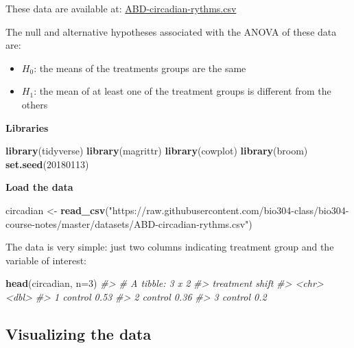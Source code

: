 \documentclass[]{book}
\newenvironment{Shaded}{\begin{snugshade}}{\end{snugshade}}
\newcommand{\CommentTok}[1]{\textcolor[rgb]{0.56,0.35,0.01}{\textit{#1}}}
\newcommand{\DataTypeTok}[1]{\textcolor[rgb]{0.13,0.29,0.53}{#1}}
\newcommand{\DecValTok}[1]{\textcolor[rgb]{0.00,0.00,0.81}{#1}}
\newcommand{\KeywordTok}[1]{\textcolor[rgb]{0.13,0.29,0.53}{\textbf{#1}}}
\newcommand{\NormalTok}[1]{#1}
\newcommand{\StringTok}[1]{\textcolor[rgb]{0.31,0.60,0.02}{#1}}
\providecommand{\tightlist}{%
  \setlength{\itemsep}{0pt}\setlength{\parskip}{0pt}}
\theoremstyle{definition}
\theoremstyle{definition}
\theoremstyle{definition}
\theoremstyle{remark}
\begin{document}
These data are available at:
\href{https://raw.githubusercontent.com/bio304-class/bio304-course-notes/master/datasets/ABD-circadian-rythms.csv}{ABD-circadian-rythms.csv}

The null and alternative hypotheses associated with the ANOVA of these
data are:

\begin{itemize}
\tightlist
\item
  \(H_0\): the means of the treatments groups are the same
\item
  \(H_1\): the mean of at least one of the treatment groups is different
  from the others
\end{itemize}

\textbf{Libraries}

\begin{Shaded}
\begin{Highlighting}[]
\KeywordTok{library}\NormalTok{(tidyverse)}
\KeywordTok{library}\NormalTok{(magrittr)}
\KeywordTok{library}\NormalTok{(cowplot)}
\KeywordTok{library}\NormalTok{(broom)}
\KeywordTok{set.seed}\NormalTok{(}\DecValTok{20180113}\NormalTok{)}
\end{Highlighting}
\end{Shaded}

\textbf{Load the data}

\begin{Shaded}
\begin{Highlighting}[]
\NormalTok{circadian <-}\StringTok{ }\KeywordTok{read_csv}\NormalTok{(}\StringTok{"https://raw.githubusercontent.com/bio304-class/bio304-course-notes/master/datasets/ABD-circadian-rythms.csv"}\NormalTok{)}
\end{Highlighting}
\end{Shaded}

The data is very simple: just two columns indicating treatment group and
the variable of interest:

\begin{Shaded}
\begin{Highlighting}[]
\KeywordTok{head}\NormalTok{(circadian, }\DataTypeTok{n=}\DecValTok{3}\NormalTok{)}
\CommentTok{#> # A tibble: 3 x 2}
\CommentTok{#>   treatment shift}
\CommentTok{#>   <chr>     <dbl>}
\CommentTok{#> 1 control    0.53}
\CommentTok{#> 2 control    0.36}
\CommentTok{#> 3 control    0.2}
\end{Highlighting}
\end{Shaded}

\hypertarget{visualizing-the-data}{%
\subsection{Visualizing the data}\label{visualizing-the-data}}
\end{document}
